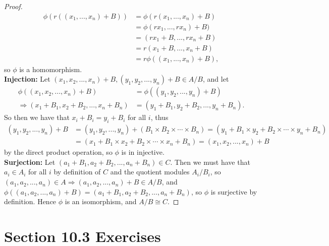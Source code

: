 \documentclass[10pt,oneside,reqno]{amsart}
\theoremstyle{plain}
\newcommand{\bee}{\begin{equation}\begin{aligned}}
\newcommand{\eee}{\end{aligned}\end{equation}}
\theoremstyle{definition}
\theoremstyle{remark}
\begin{document}
\begin{enumerate}[label=\arabic*.]
\begin{proof}
\bee
	\phi(r((x_1,...,x_n) + B)) 
	&= \phi(r(x_1,...,x_n) + B)\\
	&= \phi(rx_1,...,rx_n) + B)\\
	&= (rx_1 + B,...,rx_n + B)\\
	&= r(x_1 + B,...,x_n + B)\\
	&= r\phi((x_1,...,x_n) + B),
\eee
 so $\phi$ is a homomorphism. \\ 
\textbf{Injection: } Let $(x_1,x_2,...,x_n) + B,(y_1,y_2,...,y_n) + B \in A/B$, and let 
\begin{equation}
\begin{aligned}
\phi((x_1,x_2,...,x_n) + B) &= \phi((y_1,y_2,...,y_n) + B)\\
\Rightarrow  (x_1+B_1,x_2+B_2,...,x_n+B_n)&=(y_1+B_1,y_2+B_2,...,y_n+B_n). 
\end{aligned}
\end{equation}
So then we have that $x_i+B_i = y_i+B_i$ for all $i$, thus
 \begin{equation}
\begin{aligned}(y_1,y_2,...,y_n) + B &= (y_1,y_2,...,y_n)+(B_1 \times B_2 \times \cdots \times B_n)=
(y_1+B_1 \times y_2+B_2 \times \cdots \times y_n+B_n) \\
&= (x_1+B_1 \times x_2+B_2 \times \cdots \times x_n+B_n) = (x_1,x_2,...,x_n) + B
\end{aligned}
\end{equation}
 by the direct product operation, so $\phi$ is in injective. \\
\textbf{Surjection: } Let $(a_1+B_1,a_2+B_2,...,a_n+B_n) \in C$. Then we must have that $a_i \in A_i$ for all $i$ by definition of $C$ and the quotient modules $A_i/B_i$, so $(a_1,a_2,...,a_n) \in A \Rightarrow (a_1,a_2,...,a_n) + B \in A/B$, and $\phi((a_1,a_2,...,a_n) + B) = (a_1+B_1,a_2+B_2,...,a_n+B_n)$, so $\phi$ is surjective by definition. Hence $\phi$ is an isomorphism, and $A/B \cong C$. 
\end{proof}


\end{enumerate}

\section*{Section 10.3 Exercises}
\end{document}
